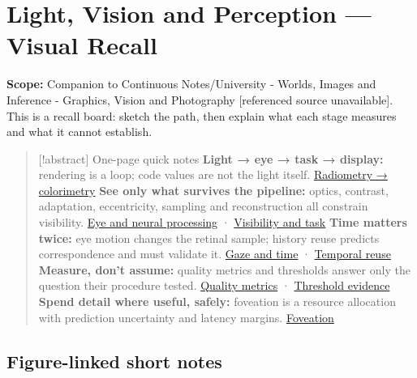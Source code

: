 \hypertarget{appendix-73c6b8ed5a87}{}
\section{Light, Vision and Perception --- Visual Recall}\label{appendix-73c6b8ed5a87-light-vision-and-perception-visual-recall}

\textbf{Scope:} Companion to {Continuous Notes/University - Worlds, Images and Inference - Graphics, Vision and Photography {[}referenced source unavailable{]}}. This is a recall board: sketch the path, then explain what each stage measures and what it cannot establish.

\begin{quote}
{[}!abstract{]} One-page quick notes \textbf{Light → eye → task → display:} rendering is a loop; code values are not the light itself. \hyperref[04-visual-computing-ii-ch042-light-must-become-a-quantity-before-it-becomes-a-color]{Radiometry → colorimetry} \textbf{See only what survives the pipeline:} optics, contrast, adaptation, eccentricity, sampling and reconstruction all constrain visibility. \hyperref[04-visual-computing-ii-ch042-the-eye-is-an-optical-instrument-with-neural-processing-inside-it]{Eye and neural processing} · \hyperref[04-visual-computing-ii-ch042-visibility-is-about-contrast-conditions-and-tasks]{Visibility and task} \textbf{Time matters twice:} eye motion changes the retinal sample; history reuse predicts correspondence and must validate it. \hyperref[04-visual-computing-ii-ch042-a-gaze-sample-needs-a-time-as-well-as-a-direction]{Gaze and time} · \hyperref[04-visual-computing-ii-ch042-temporal-reconstruction-is-an-inference-about-correspondence]{Temporal reuse} \textbf{Measure, don't assume:} quality metrics and thresholds answer only the question their procedure tested. \hyperref[04-visual-computing-ii-ch042-quality-numbers-need-a-question-they-can-actually-answer]{Quality metrics} · \hyperref[04-visual-computing-ii-ch042-a-threshold-is-evidence-from-a-procedure-not-a-universal-border]{Threshold evidence} \textbf{Spend detail where useful, safely:} foveation is a resource allocation with prediction uncertainty and latency margins. \hyperref[04-visual-computing-ii-ch042-foveation-is-allocation-under-uncertain-perception-and-timing]{Foveation}
\end{quote}

\subsection{Figure-linked short notes}\label{appendix-73c6b8ed5a87-figure-linked-short-notes}


